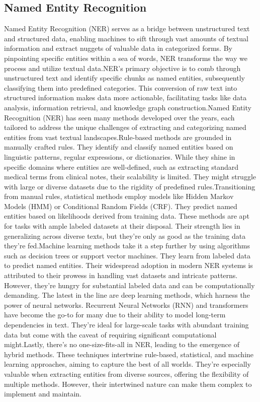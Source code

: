 \subsection{Named Entity Recognition}
Named Entity Recognition (NER)\cite{DataCamp2025NER} serves as a bridge between unstructured text and structured data, enabling machines to sift through vast amounts of textual information and extract nuggets of valuable data in categorized forms. By pinpointing specific entities within a sea of words, NER transforms the way we process and utilize textual data.NER's primary objective is to comb through unstructured text and identify specific chunks as named entities, subsequently classifying them into predefined categories. This conversion of raw text into structured information makes data more actionable, facilitating tasks like data analysis, information retrieval, and knowledge graph construction.Named Entity Recognition (NER) has seen many methods developed over the years, each tailored to address the unique challenges of extracting and categorizing named entities from vast textual landscapes.Rule-based methods are grounded in manually crafted rules. They identify and classify named entities based on linguistic patterns, regular expressions, or dictionaries. While they shine in specific domains where entities are well-defined, such as extracting standard medical terms from clinical notes, their scalability is limited. They might struggle with large or diverse datasets due to the rigidity of predefined rules.Transitioning from manual rules, statistical methods employ models like Hidden Markov Models (HMM) or Conditional Random Fields (CRF). They predict named entities based on likelihoods derived from training data. These methods are apt for tasks with ample labeled datasets at their disposal. Their strength lies in generalizing across diverse texts, but they're only as good as the training data they're fed.Machine learning methods take it a step further by using algorithms such as decision trees or support vector machines. They learn from labeled data to predict named entities. Their widespread adoption in modern NER systems is attributed to their prowess in handling vast datasets and intricate patterns. However, they're hungry for substantial labeled data and can be computationally demanding.
The latest in the line are deep learning methods, which harness the power of neural networks. Recurrent Neural Networks (RNN) and transformers have become the go-to for many due to their ability to model long-term dependencies in text. They're ideal for large-scale tasks with abundant training data but come with the caveat of requiring significant computational might.Lastly, there's no one-size-fits-all in NER, leading to the emergence of hybrid methods. These techniques intertwine rule-based, statistical, and machine learning approaches, aiming to capture the best of all worlds. They're especially valuable when extracting entities from diverse sources, offering the flexibility of multiple methods. However, their intertwined nature can make them complex to implement and maintain.
